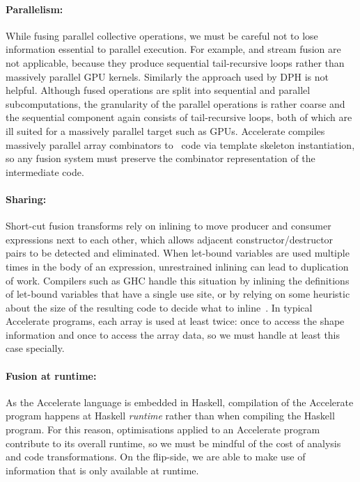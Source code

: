 \paragraph{Parallelism:} While fusing parallel collective operations, we must be
careful not to lose information essential to parallel execution. For example,
 and stream
fusion are not applicable, because they produce sequential tail-recursive loops
rather than massively parallel GPU kernels. Similarly the
 approach used by
DPH is not helpful. Although fused operations are
split into sequential and parallel subcomputations, the granularity of the
parallel operations is rather coarse and the sequential component again consists
of tail-recursive loops, both of which are ill suited for a massively parallel
target such as GPUs. Accelerate compiles
massively parallel array combinators to \CUDA\ code via template skeleton
instantiation, so any fusion system must preserve the combinator representation
of the intermediate code.

\paragraph{Sharing:} Short-cut fusion transforms rely on
inlining to move producer and consumer expressions next to each other, which
allows adjacent constructor/destructor pairs to be detected and eliminated. When
let-bound variables are used multiple times in the body of an expression,
unrestrained inlining can lead to duplication of work. Compilers such as GHC
handle this situation by inlining the definitions of let-bound variables that
have a single use site, or by relying on some heuristic about the size of the
resulting code to decide what to inline~\cite{PeytonJones:2003gb}. In typical
Accelerate programs, each array is used at least twice: once to access the shape
information and once to access the array data, so we must handle at least this
case specially.

\paragraph{Fusion at runtime:} As the Accelerate language is embedded in
Haskell, compilation of the Accelerate program happens at Haskell
\emph{runtime} rather than when compiling the Haskell program. For this reason,
optimisations applied to an Accelerate program contribute to its overall
runtime, so we must be mindful of the cost of analysis and code transformations.
On the flip-side, we are able to make use of information that is only available
at runtime.

